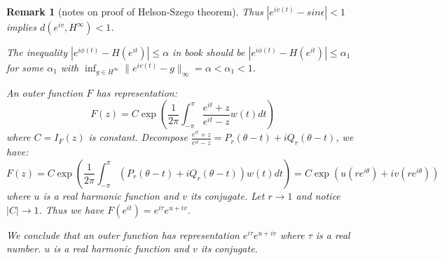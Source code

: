 \documentclass{report}
\newtheorem{remark}{Remark}
\numberwithin{theorem}{subsection}
\numberwithin{remark}{subsection}
\newcommand{\norm}[1]{\lVert#1\rVert}
\newcommand{\abs}[1]{\left\lvert#1\right\rvert}
\begin{document}
\begin{remark}[notes on proof of Helson-Szego theorem]
    Thus $\abs{e^{iv(t)}-sin\epsilon}<1$ implies $d(e^{iv},H^\infty)<1$.\par
    The inequality $\abs{e^{i\phi(t)}-H(e^{it})}\leq\alpha$ in book should be $\abs{e^{i\phi(t)}-H(e^{it})}\leq\alpha_1$ for some $\alpha_1$ with $\inf_{g\in H^\infty}{\norm{e^{iv(t)}-g}_\infty}=\alpha<\alpha_1<1$.\par
    An outer function $F$ has representation:
    \begin{equation*}
        F(z)=C\exp{(\frac{1}{2\pi}\int_{-\pi}^{\pi}{\frac{e^{it}+z}{e^{it}-z}w(t)d t})}
    \end{equation*}
    where $C=I_F(z)$ is constant. Decompose $\frac{e^{it}+z}{e^{it}-z}=P_r(\theta-t)+iQ_r(\theta-t)$, we have:
    \begin{equation*}
        F(z)=C\exp{(\frac{1}{2\pi}\int_{-\pi}^{\pi}{(P_r(\theta-t)+iQ_r(\theta-t))w(t)d t})}=C\exp{(u(re^{i\theta})+iv(re^{i\theta}))}
    \end{equation*}
    where $u$ is a real harmonic function and $v$ its conjugate. Let $r\to 1$ and notice $\abs{C}\to 1$. Thus we have $F(e^{it})=e^{i\tau}e^{u+iv}$.\par
    We conclude that an outer function has representation $e^{i\tau}e^{u+iv}$ where $\tau$ is a real number. $u$ is a real harmonic function and $v$ its conjugate.
\end{remark}
\end{document}
